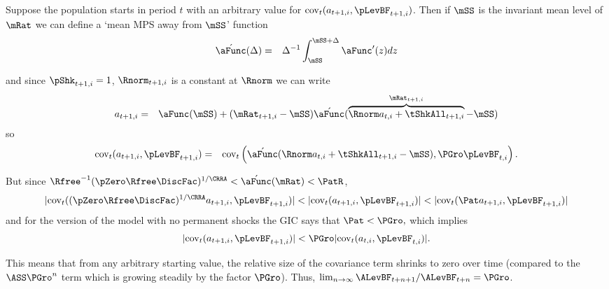 \documentclass[titlepage]{\econtex}\providecommand{\texname}{BufferStockTheory}
\begin{document}
Suppose the population starts in period $t$ with an arbitrary value for
 $\mbox{cov}_{t}(a_{t+1,i},\pLevBF_{t+1,i})$. 
  Then if $\mSS$ is the invariant mean
level of $\mRat$ we can define a `mean MPS away from $\mSS$' function
\begin{eqnarray}
 \acute{\aFunc}(\Delta) & = &  \Delta^{-1}\int_{\mSS}^{\mSS+\Delta} \aFunc^{\prime}(z)
 dz \label{eq:checkaFunc} \nonumber
\end{eqnarray}
\begin{comment}
so that
\begin{eqnarray}
 \aFunc(\mRat_{t+1,i}) & = & \aFunc(\Rnorm_{t+1,i} a_{t+1,i}+\tShkAll_{t+1,i})
\\ & = & \aFunc(\mSS) +(\mRat_{t+1,i}-\mSS)\acute{\aFunc}(\Rnorm  a_{t+1,i}+\tShkAll_{t+1,i})
\end{eqnarray}
\end{comment}
and since $\pShk_{t+1,i}=1$, $\Rnorm_{t+1,i}$ is a constant at $\Rnorm$ we can write
\begin{eqnarray}
  a_{t+1,i} & = &
  \aFunc(\mSS)+(\mRat_{t+1,i}-\mSS)\acute{\aFunc}(\overbrace{\Rnorm
    a_{t,i}+\tShkAll_{t+1,i}}^{\mRat_{t+1,i}}-\mSS) \nonumber
\end{eqnarray}
so
\begin{eqnarray}
\mbox{cov}_{t}(a_{t+1,i},\pLevBF_{t+1,i})
&=&\mbox{cov}_{t}\left(\acute{\aFunc}(\Rnorm  a_{t,i}+\tShkAll_{t+1,i}-\mSS)
  ,\PGro   \pLevBF_{t,i}\right). \nonumber
\end{eqnarray}

But since ${\Rfree}^{-1}(\pZero  \Rfree\DiscFac)^{1/\CRRA} < \acute{\aFunc}(\mRat) < \PatR $,
\begin{equation}
  |\mbox{cov}_{t}((\pZero  \Rfree\DiscFac)^{1/\CRRA}a_{t+1,i},\pLevBF_{t+1,i})| <
  |\mbox{cov}_{t}(a_{t+1,i},\pLevBF_{t+1,i})| <
  |\mbox{cov}_{t}({\Pat}a_{t+1,i},\pLevBF_{t+1,i})| \nonumber
\end{equation}
and for the version of the model with no permanent shocks the GIC
says that
${\Pat} < \PGro, $ which implies
\begin{eqnarray}
  |\mbox{cov}_{t}(a_{t+1,i},\pLevBF_{t+1,i})| < \PGro
  |\mbox{cov}_{t}(a_{t,i},\pLevBF_{t,i})|. \nonumber
\end{eqnarray}

This means that from any arbitrary starting value, the relative
size of the covariance term shrinks to zero over time (compared
to the $\ASS \PGro^{n}$ term which is growing steadily
by the factor $\PGro$).  Thus, $\lim_{n \rightarrow \infty} \ALevBF_{t+n+1}/\ALevBF_{t+n} = \PGro$.
\end{document}
